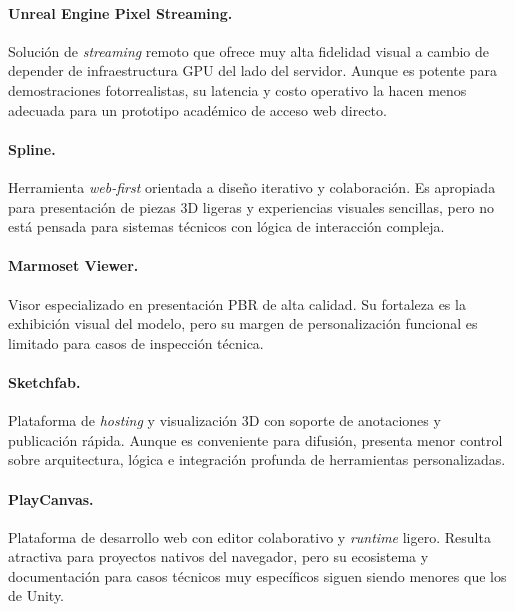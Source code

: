 \paragraph{Unreal Engine Pixel Streaming.} Soluci\'on de \textit{streaming} remoto que ofrece muy alta fidelidad visual a cambio de depender de infraestructura GPU del lado del servidor. Aunque es potente para demostraciones fotorrealistas, su latencia y costo operativo la hacen menos adecuada para un prototipo acad\'emico de acceso web directo.

\paragraph{Spline.} Herramienta \textit{web-first} orientada a dise\~no iterativo y colaboraci\'on. Es apropiada para presentaci\'on de piezas 3D ligeras y experiencias visuales sencillas, pero no est\'a pensada para sistemas t\'ecnicos con l\'ogica de interacci\'on compleja.

\paragraph{Marmoset Viewer.} Visor especializado en presentaci\'on PBR de alta calidad. Su fortaleza es la exhibici\'on visual del modelo, pero su margen de personalizaci\'on funcional es limitado para casos de inspecci\'on t\'ecnica.

\paragraph{Sketchfab.} Plataforma de \textit{hosting} y visualizaci\'on 3D con soporte de anotaciones y publicaci\'on r\'apida. Aunque es conveniente para difusi\'on, presenta menor control sobre arquitectura, l\'ogica e integraci\'on profunda de herramientas personalizadas.

\paragraph{PlayCanvas.} Plataforma de desarrollo web con editor colaborativo y \textit{runtime} ligero. Resulta atractiva para proyectos nativos del navegador, pero su ecosistema y documentaci\'on para casos t\'ecnicos muy espec\'ificos siguen siendo menores que los de Unity.

